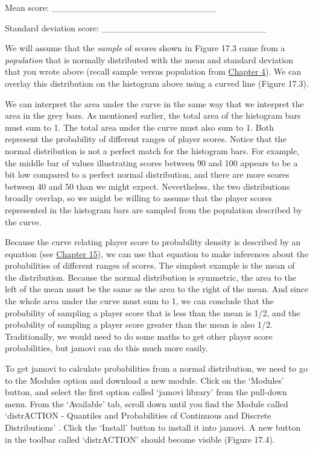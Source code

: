 \documentclass[
  openany]{scrbook}
\begin{document}
Mean score: \_\_\_\_\_\_\_\_\_\_\_\_\_\_\_\_\_\_\_\_\_\_\_\_\_\_

Standard deviation score: \_\_\_\_\_\_\_\_\_\_\_\_\_\_\_\_\_\_\_\_\_\_\_\_\_\_

We will assume that the \emph{sample} of scores shown in Figure 17.3 came from a \emph{population} that is normally distributed with the mean and standard deviation that you wrote above (recall sample versus population from \protect\hyperlink{Chapter_4}{Chapter 4}).
We can overlay this distribution on the histogram above using a curved line (Figure 17.3).

We can interpret the area under the curve in the same way that we interpret the area in the grey bars.
As mentioned earlier, the total area of the histogram bars must sum to 1.
The total area under the curve must also sum to 1.
Both represent the probability of different ranges of player scores.
Notice that the normal distribution is not a perfect match for the histogram bars.
For example, the middle bar of values illustrating scores between 90 and 100 appears to be a bit low compared to a perfect normal distribution, and there are more scores between 40 and 50 than we might expect.
Nevertheless, the two distributions broadly overlap, so we might be willing to assume that the player scores represented in the histogram bars are sampled from the population described by the curve.

Because the curve relating player score to probability density is described by an equation (see \protect\hyperlink{Chapter_15}{Chapter 15}), we can use that equation to make inferences about the probabilities of different ranges of scores.
The simplest example is the mean of the distribution.
Because the normal distribution is symmetric, the area to the left of the mean must be the same as the area to the right of the mean.
And since the whole area under the curve must sum to 1, we can conclude that the probability of sampling a player score that is less than the mean is 1/2, and the probability of sampling a player score greater than the mean is also 1/2.
Traditionally, we would need to do some maths to get other player score probabilities, but jamovi can do this much more easily.

To get jamovi to calculate probabilities from a normal distribution, we need to go to the Modules option and download a new module.
Click on the `Modules' button, and select the first option called `jamovi library' from the pull-down menu.
From the `Available' tab, scroll down until you find the Module called `distrACTION - Quantiles and Probabilities of Continuous and Discrete Distributions' \citep{Rihs2018}.
Click the `Install' button to install it into jamovi.
A new button in the toolbar called `distrACTION' should become visible (Figure 17.4).
\end{document}
